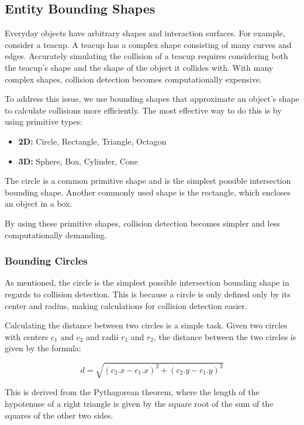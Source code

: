 \documentclass{article}
\begin{document}
\subsection{Entity Bounding Shapes}
Everyday objects have arbitrary shapes and interaction surfaces. For example,
consider a teacup. A teacup has a complex shape consisting of many curves and
edges. Accurately simulating the collision of a teacup requires considering
both the teacup's shape and the shape of the object it collides with. With many
complex shapes, collision detection becomes computationally expensive.

To address this issue, we use bounding shapes that approximate an object's
shape to calculate collisions more efficiently. The most effective way to do
this is by using primitive types:

\begin{itemize}
    \item \textbf{2D:} Circle, Rectangle, Triangle, Octagon
    \item \textbf{3D:} Sphere, Box, Cylinder, Cone
\end{itemize}

The circle is a common primitive shape and is the simplest possible
intersection bounding shape. Another commonly used shape is the rectangle,
which encloses an object in a box.

By using these primitive shapes, collision detection becomes simpler and less
computationally demanding.

\subsubsection{Bounding Circles}
As mentioned, the circle is the simplest possible intersection bounding shape
in regards to collision detection. This is because a circle is only defined
only by its center and radius, making calculations for collision detection
easier.

Calculating the distance between two circles is a simple task. Given two
circles with centers $c_1$ and $c_2$ and radii $r_1$ and $r_2$, the distance
between the two circles is given by the formula:

\begin{equation}
    d = \sqrt{(c_2.x - c_1.x)^2 + (c_2.y - c_1.y)^2}
\end{equation}

This is derived from the Pythagorean theorem, where the length of the
hypotenuse of a right triangle is given by the square root of the sum of the
squares of the other two sides.
\end{document}

